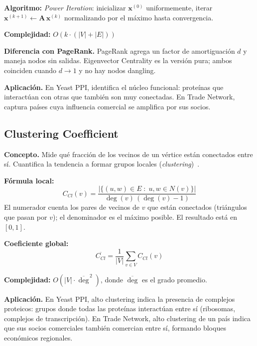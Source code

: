 \textbf{Algoritmo:} \textit{Power Iteration}: inicializar $\mathbf{x}^{(0)}$
uniformemente, iterar $\mathbf{x}^{(k+1)} \leftarrow \mathbf{A}\,\mathbf{x}^{(k)}$
normalizando por el máximo hasta convergencia.

\textbf{Complejidad:} $O(k \cdot (|V|+|E|))$

\textbf{Diferencia con PageRank.} PageRank agrega un factor de amortiguación $d$ y
maneja nodos sin salidas. Eigenvector Centrality es la versión pura; ambos coinciden
cuando $d \to 1$ y no hay nodos dangling.

\textbf{Aplicación.} En Yeast PPI, identifica el núcleo funcional: proteínas que
interactúan con otras que también son muy conectadas. En Trade Network, captura países
cuya influencia comercial se amplifica por sus socios.

\subsection{Clustering Coefficient}

\textbf{Concepto.} Mide qué fracción de los vecinos de un vértice están conectados
entre sí. Cuantifica la tendencia a formar grupos locales (\textit{clustering})~\cite{watts1998}.

\textbf{Fórmula local:}
\[
C_{Cl}(v) = \frac{|\{(u,w) \in E \;:\; u,w \in N(v)\}|}{\deg(v)\,(\deg(v)-1)}
\]
El numerador cuenta los pares de vecinos de $v$ que están conectados (triángulos
que pasan por $v$); el denominador es el máximo posible. El resultado está en $[0,1]$.

\textbf{Coeficiente global:}
\[
\overline{C_{Cl}} = \frac{1}{|V|} \sum_{v \in V} C_{Cl}(v)
\]

\textbf{Complejidad:} $O(|V| \cdot \overline{\deg}^{\,2})$, donde $\overline{\deg}$ es el grado promedio.

\textbf{Aplicación.} En Yeast PPI, alto clustering indica la presencia de complejos
proteicos: grupos donde todas las proteínas interactúan entre sí (ribosomas, complejos
de transcripción). En Trade Network, alto clustering de un país indica que sus socios
comerciales también comercian entre sí, formando bloques económicos regionales.
